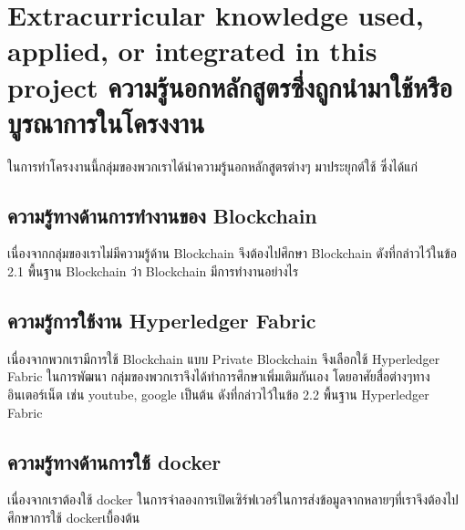 
\section{\ifenglish%
Extracurricular knowledge used, applied, or integrated in this project
\else%
ความรู้นอกหลักสูตรซึ่งถูกนำมาใช้หรือบูรณาการในโครงงาน
\fi
}
\enskip \enskip \enskip \enskip \enskip ในการทำโครงงานนี้กลุ่มของพวกเราได้นำความรู้นอกหลักสูตรต่างๆ มาประยุกต์ใช้ ซึ่งได้แก่

\subsection{ความรู้ทางด้านการทำงานของ Blockchain}
\enskip \enskip \enskip เนื่องจากกลุ่มของเราไม่มีความรู้ด้าน Blockchain จึงต้องไปศึกษา Blockchain ดังที่กล่าวไว้ในข้อ 2.1 พื้นฐาน Blockchain ว่า Blockchain มีการทำงานอย่างไร

\subsection{ความรู้การใช้งาน Hyperledger Fabric}
\enskip \enskip \enskip เนื่องจากพวกเรามีการใช้ Blockchain แบบ Private Blockchain จึงเลือกใช้ Hyperledger Fabric  ในการพัฒนา กลุ่มของพวกเราจึงได้ทำการศึกษาเพิ่มเติมกันเอง
โดยอาศัยสื่อต่างๆทางอินเตอร์เน็ต เช่น youtube, google เป็นต้น ดังที่กล่าวไว้ในข้อ 2.2 พื้นฐาน Hyperledger Fabric


\subsection{ความรู้ทางด้านการใช้ docker}
\enskip \enskip \enskip เนื่องจากเราต้องใช้ docker ในการจำลองการเปิดเซิร์ฟเวอร์ในการส่งข้อมูลจากหลายๆที่เราจึงต้องไปศึกษาการใช้ dockerเบื้องต้น



